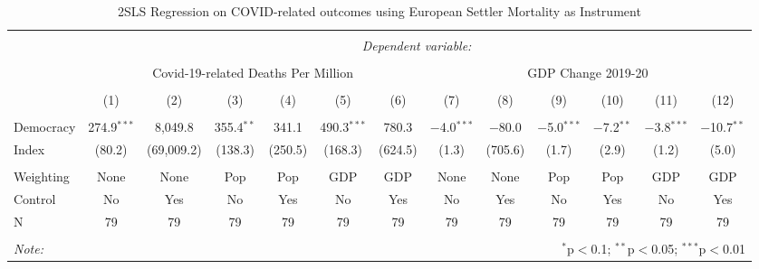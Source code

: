 \begin{table}[!htbp] \centering 
  \caption{2SLS Regression on COVID-related outcomes using European Settler Mortality as Instrument} 
  \label{} 
  \footnotesize
\begin{tabular}{@{\extracolsep{0pt}}lcccccc|cccccc} 
\\[-1.8ex]\hline 
\hline \\[-1.8ex] 
 & \multicolumn{12}{c}{\textit{Dependent variable:}} \\ 
\cline{2-13} 
\\[-1.8ex] & \multicolumn{6}{c}{Covid-19-related Deaths Per Million} & \multicolumn{6}{c}{GDP Change 2019-20} \\ 
\\[-1.8ex] & (1) & (2) & (3) & (4) & (5) & (6) & (7) & (8) & (9) & (10) & (11) & (12)\\ 
\hline \\[-1.8ex] 
Democracy & 274.9$^{***}$ & 8,049.8 & 355.4$^{**}$ & 341.1 & 490.3$^{***}$ & 780.3 & $-$4.0$^{***}$ & $-$80.0 & $-$5.0$^{***}$ & $-$7.2$^{**}$ & $-$3.8$^{***}$ & $-$10.7$^{**}$ \\ 
Index  & (80.2) & (69,009.2) & (138.3) & (250.5) & (168.3) & (624.5) & (1.3) & (705.6) & (1.7) & (2.9) & (1.2) & (5.0) \\
 \hline \\[-1.8ex] 
Weighting & None & None & Pop & Pop & GDP & GDP & None & None & Pop & Pop & GDP & GDP \\ 
Control & No & Yes & No & Yes & No & Yes & No & Yes & No & Yes & No & Yes \\ 
N & 79 & 79 & 79 & 79 & 79 & 79 & 79 & 79 & 79 & 79 & 79 & 79 \\ 
\hline 
\hline \\[-1.8ex] 
\textit{Note:}  & \multicolumn{12}{r}{$^{*}$p$<$0.1; $^{**}$p$<$0.05; $^{***}$p$<$0.01} \\ 
\end{tabular} 
\end{table} 

